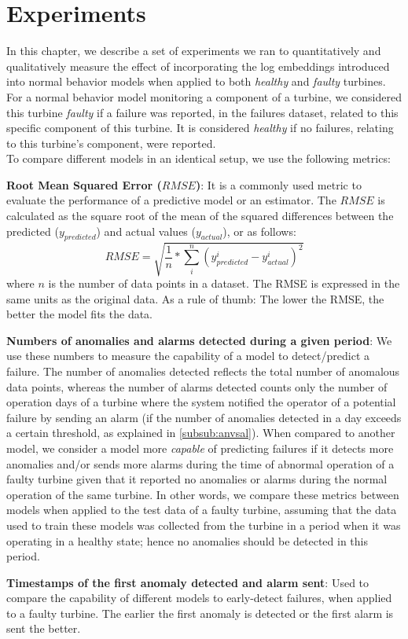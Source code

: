 \chapter{Experiments}
\label{chap:experiments}
In this chapter, we describe a set of experiments we ran to quantitatively and qualitatively measure the effect of incorporating the log embeddings introduced into normal behavior models
when applied to both \emph{healthy} and \emph{faulty} turbines. For a normal behavior model monitoring a component of a turbine, we considered this turbine \emph{faulty} if 
a failure was reported, in the failures dataset, related to this specific component of this turbine. It is considered \emph{healthy} if no failures, relating to this turbine's component,
were reported.\\
To compare different models in an identical setup, we use the following metrics:
\begin{bulletList}
    \item \textbf{Root Mean Squared Error ($RMSE$)}: It is a commonly used metric to evaluate the performance of a predictive model or an estimator.
    The $RMSE$ is calculated as the square root of the mean of the squared differences between the predicted ($y_{predicted}$) and actual values ($y_{actual}$), or as follows:
    \begin{equation}
        RMSE = \sqrt{\frac{1}{n} * \sum_{i}^{n} (y_{predicted}^i - y_{actual}^i)^2}
    \end{equation}
    where $n$ is the number of data points in a dataset. The RMSE is expressed in the same units as the original data. 
    As a rule of thumb: The lower the RMSE, the better the model fits the data.
    \item \textbf{Numbers of anomalies and alarms detected during a given period}: We use these numbers to measure the capability of a model to detect/predict a failure. 
    The number of anomalies detected reflects the total number of anomalous data points, whereas the number of alarms detected counts only the number of operation days of a turbine 
    where the system notified the operator of a potential failure by sending an alarm (if the number of anomalies detected in a day exceeds a certain threshold, 
    as explained in \ref{subsub:anvsal}). When compared to another model, we consider a model more \emph{capable} of predicting failures if it 
    detects more anomalies and/or sends more alarms during the time of abnormal operation of a faulty turbine given that it reported no anomalies or alarms during the normal operation 
    of the same turbine. In other words, we compare these metrics between models when applied to the test data of a faulty turbine, assuming that the data used to train these models 
    was collected from the turbine in a period when it was operating in a healthy state; hence no anomalies should be detected in this period.
    \item \textbf{Timestamps of the first anomaly detected and alarm sent}: Used to compare the capability of different models to early-detect failures, when applied to a faulty turbine. The earlier
    the first anomaly is detected or the first alarm is sent the better.
\end{bulletList}
